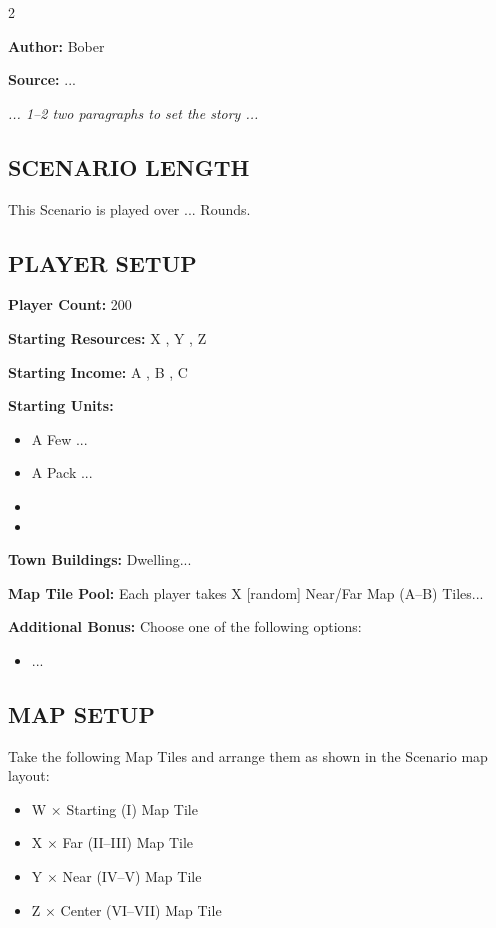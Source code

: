 
\begin{multicols*}{2}

\textbf{Author:} Bober

\textbf{Source:} ...

\textit{... 1--2 two paragraphs to set the story ...}

\subsection*{\MakeUppercase{Scenario Length}}

This Scenario is played over ... Rounds.

\subsection*{\MakeUppercase{Player Setup}}

\textbf{Player Count:} 200

\textbf{Starting Resources:} X , Y , Z 

\textbf{Starting Income:} A , B , C 

\textbf{Starting Units:}
\begin{itemize}
  \item A Few ...
  \item A Pack ...
  \item {}
  \item {}
\end{itemize}

\textbf{Town Buildings:}  Dwelling...

\textbf{Map Tile Pool:} Each player takes X [random] Near/Far Map (A--B) Tiles...

\textbf{Additional Bonus:} Choose one of the following options:

\begin{itemize}
    \item ...
\end{itemize}

\subsection*{\MakeUppercase{Map Setup}}

Take the following Map Tiles and arrange them as shown in the Scenario map layout:
\begin{itemize}
  \item W × Starting (I) Map Tile
  \item X × Far (II--III) Map Tile
  \item Y × Near (IV--V) Map Tile
  \item Z × Center (VI--VII) Map Tile
\end{itemize}


\end{multicols*}
